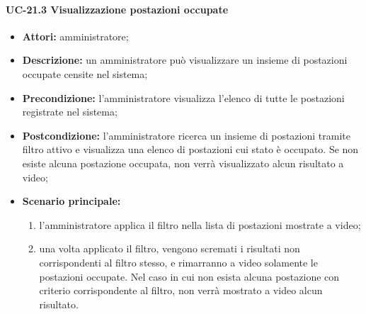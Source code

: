 \paragraph{UC-21.3 Visualizzazione postazioni occupate}
\begin{itemize}
    \item \textbf{Attori:} amministratore;
    \item \textbf{Descrizione:} un amministratore pu\`{o} visualizzare un insieme di postazioni occupate censite nel sistema;
    \item \textbf{Precondizione:} l'amministratore visualizza l'elenco di tutte le postazioni registrate nel sistema;
    \item \textbf{Postcondizione:} l'amministratore ricerca un insieme di postazioni tramite filtro attivo e visualizza una elenco di postazioni cui stato è occupato. Se non esiste alcuna postazione occupata, non verrà visualizzato alcun risultato a video;
    \item \textbf{Scenario principale:}
    \begin{enumerate}
        \item l'amministratore applica il filtro nella lista di postazioni mostrate a video;
        \item una volta applicato il filtro, vengono scremati i risultati non corrispondenti al filtro stesso, e rimarranno a video solamente le postazioni occupate. Nel caso in cui non esista alcuna postazione con criterio corrispondente al filtro, non verrà mostrato a video alcun risultato.
    \end{enumerate}
\end{itemize}


